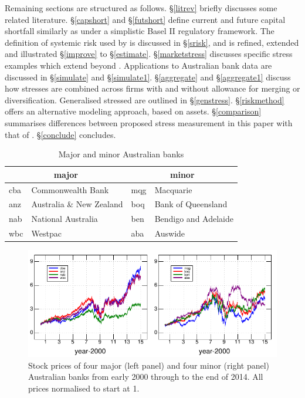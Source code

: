 \documentclass[authoryear]{elsarticle}
\newcommand{\sref}[1]{\S\ref{#1}}
\begin{document}
Remaining sections are structured as follows. \sref{litrev} briefly discusses some related literature. \sref{capshort} and \sref{futshort} define current and future  capital shortfall similarly as \cite{brownlees2015} under a simplistic Basel II regulatory framework. The definition of systemic risk used by \cite{brownlees2015} is discussed in \sref{srisk}, and is refined, extended and illustrated \sref{improve} to \sref{estimate}. \sref{marketstress} discusses specific stress examples which extend beyond \cite{brownlees2015}. Applications to Australian bank data are discussed in \sref{simulate} and \sref{simulate1}. \sref{aggregate} and \sref{aggregate1} discuss how stresses are combined across firms with and without allowance for merging or diversification. Generalised stressed are outlined in \sref{genstress}. \sref{riskmethod} offers an alternative modeling approach, based on assets. \sref{comparison} summarises differences between proposed stress measurement in this paper with that of 
\cite{brownlees2015}. \sref{conclude} concludes.

\begin{table}[htdp]
\label{banks}\caption{Major and minor Australian banks}\label{eightbanks}
\begin{center}
\begin{tabular}{l|l||l|l}
\hline
 \multicolumn{2}{c||}{major}& \multicolumn{2}{c}{minor}\\
 \hline
cba & Commonwealth Bank  & mqg & Macquarie \\
anz & Australia \& New Zealand  & boq & Bank of Queensland\\
nab & National Australia  & ben & Bendigo and Adelaide \\
wbc & Westpac & aba & Auswide \\
\hline
\end{tabular}
\end{center}
\end{table}%


\begin{figure}[htbp]
\begin{center}
\includegraphics{figures/prices.pdf}
\caption{Stock  prices of four major (left panel) and four minor (right panel) Australian banks from early 2000 through to the end of 2014.  All prices normalised to start at 1.}
\label{prices}
\end{center}
\end{figure}
\end{document}
